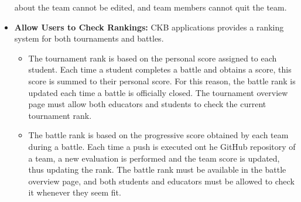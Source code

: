 \documentclass[a4paper, 11pt, titlepage]{article}
\begin{document}
\begin{itemize}
    about the team cannot be edited, and team members cannot quit the team.
    \item \textbf{Allow Users to Check Rankings:} CKB applications provides a ranking system for both tournaments and battles. 
    \begin{itemize}
        \item The tournament rank is based on the personal score assigned to each student. Each time a student completes a battle and obtains a score, this score is summed to their personal score.
        For this reason, the battle rank is updated each time a battle is officially closed. The tournament overview page must allow both educators and students to check the current tournament rank.
        \item The battle rank is based on the progressive score obtained by each team during a battle. Each time a push is executed ont he GitHub repository of a team, a new evaluation is performed and the team score is updated, thus updating the rank.
        The battle rank must be available in the battle overview page, and both students and educators must be allowed to check it whenever they seem fit. 
    \end{itemize} 


\end{itemize}
\end{document}
